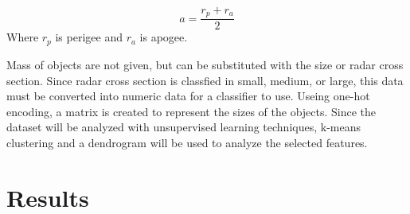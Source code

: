 \documentclass[12pt,a4paper]{article}
\begin{document}
\begin{equation}
a = \frac{r_p + r_a }{2}
\end{equation}
Where $r_p$ is perigee and $r_a$ is apogee.

Mass of objects are not given, but can be substituted with the size or radar cross section. Since radar cross section is classfied in small, medium, or large, this data must be converted into numeric data for a classifier to use. Useing one-hot encoding, a matrix is created to represent the sizes of the objects.
Since the dataset will be analyzed with unsupervised learning techniques, k-means clustering and a dendrogram will be used to analyze the selected features.    

\section{Results}
\end{document}
